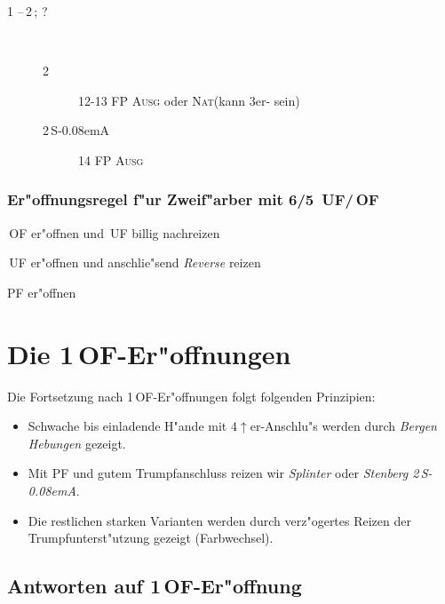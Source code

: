 \documentclass[11pt,german,twocolumn]{scrartcl}
\def\kar{\nobreak\,\Di\xspace}
\def\tre{\nobreak\,\Cl\xspace}
\def\ka{\Di\xspace}
\def\bad{$^-$\xspace}
\def\pl{$\uparrow$\xspace}
\def\uf{\nobreak\textsf{\,UF}\xspace}
\def\of{\nobreak\textsf{\,OF}\xspace}
\def\sa{\nobreak\textsf{S\kern-0.08emA}\xspace}
\def\SA{\nobreak\,\sa}
\def\sep{\,--\,}
\newcommand{\conv}[1]{\emph{#1}}
\def\bal{\textsc{Ausg}\xspace}
\def\nat{\textsc{Nat}\xspace}
\def\pf{\textsc{PF}\xspace}
\def\bdsc{\begin{description}}
\def\edsc{\end{description}}
\newcommand{\Index}[1]{#1\index{#1}}
\begin{document}
\bdsc
  \item[1\kar{}\sep2\tre; ?]~
    \bdsc
    \item[2\kar] 12-13 FP \bal oder \nat (kann 3er-\ka sein)
    \item[2\SA] 14 FP \bal
    \edsc
\edsc


\subsubsection*{\label{zfregel}Er"offnungsregel f"ur Zweif"arber mit 6/5 \uf/\of}

\bdsc
\setlength{\labelsep}{1ex}
\item[4\pl{} Verlierer:] \of er"offnen und \uf billig nachreizen
\item[3-4 Verlierer:] \uf er"offnen und anschlie"send \conv{Reverse}
  reizen
\item[0-3\bad{} Verlierer:] \pf er"offnen
\edsc

\newpage
\section{Die 1\of-Er"offnungen}

Die Fortsetzung nach 1\of-Er"offnungen folgt folgenden Prinzipien:
\begin{itemize}
\setlength{\itemsep}{0.5ex}
\item Schwache bis einladende H"ande mit 4\pl{}er-Anschlu"s werden durch
  \conv{Bergen Hebungen} gezeigt.
\item Mit \pf und gutem Trumpfanschluss reizen wir
  \conv{\Index{Splinter}} oder \conv{Stenberg 2\SA}.
\item Die restlichen starken Varianten werden durch verz"ogertes
  Reizen der Trumpfunterst"utzung gezeigt (Farbwechsel).
\end{itemize}

\subsection{Antworten auf 1\of-Er"offnung}
\end{document}
